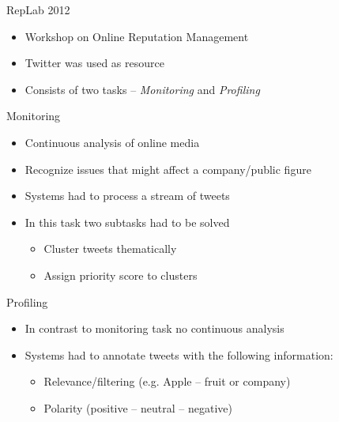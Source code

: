 \documentclass[12pt,a4paper]{beamer}
\begin{document}
\begin{frame}{RepLab 2012}
\begin{itemize}
\item Workshop on Online Reputation Management
\item Twitter was used as resource
\item Consists of two tasks -- \textit{Monitoring} and \textit{Profiling}
\end{itemize}
\end{frame}

\begin{frame}{Monitoring}
\begin{itemize}
\item Continuous analysis of online media
\item Recognize issues that might affect a company/public figure
\item Systems had to process a stream of tweets
\item In this task two subtasks had to be solved
\begin{itemize}
\item Cluster tweets thematically
\item Assign priority score to clusters
\end{itemize}
\end{itemize}
\end{frame}

\begin{frame}{Profiling}
\begin{itemize}
\item In contrast to monitoring task no continuous analysis
\item Systems had to annotate tweets with the following information:
\begin{itemize}
\item Relevance/filtering (e.g. Apple -- fruit or company)
\item Polarity (positive -- neutral -- negative)
\end{itemize}
\end{itemize}
\end{frame}
\end{document}
